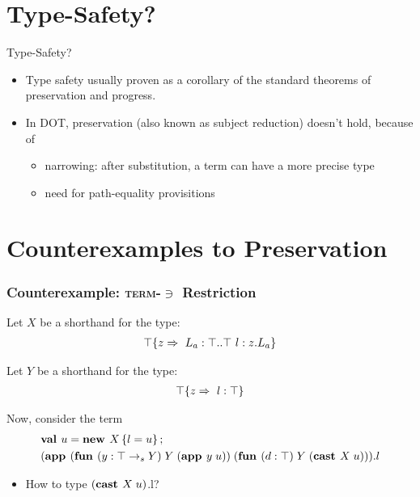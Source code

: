 \documentclass{beamer}
\begin{document}
\section{Type-Safety?}

\begin{frame}{Type-Safety?}
\begin{itemize}
\item Type safety usually proven as a corollary of the standard theorems of preservation and progress.
\item In DOT, preservation (also known as subject reduction) doesn't hold, because of
\begin{itemize}
\item narrowing: after substitution, a term can have a more precise type
\item need for path-equality provisitions
\end{itemize}
\end{itemize}
\end{frame}

\section{Counterexamples to Preservation}

\begin{frame}[fragile]
\frametitle{Counterexample: \texorpdfstring{\textsc{term-$\ni$}}{Term-Mem} Restriction}
Let $X$ be a shorthand for the type:
\begin{align*}
\top \{z \Rightarrow 
\ L_a : \top..\top
\ l : z.L_a
 \}
\end{align*}

Let $Y$ be a shorthand for the type:
\begin{align*}
\top \{z \Rightarrow 
\ l : \top
 \}
\end{align*}

Now, consider the term
\begin{align*}
&\mlnew u {X \ldefs{ l = u }}{
\app {(\fun y {\arrow \Top Y} {Y} {\app y u})} {(\fun d \Top Y {\cast X u})}.l
}
\end{align*}

\begin{itemize}
\item How to type ${(\textbf{cast }X\;u)}$.l?
\end{itemize}
\end{frame}
\end{document}
